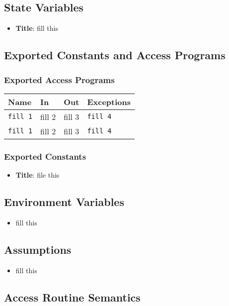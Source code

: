 \documentclass[12pt, titlepage]{article}
\begin{document}
\subsection{State Variables}
\begin{itemize}
    \item \textbf{Title}: fill this 
\end{itemize}

\subsection{Exported Constants and Access Programs}
\subsubsection{Exported Access Programs}
\begin{tabular}{|l|l|l|l|}
    \hline
    \textbf{Name} & \textbf{In} & \textbf{Out} & \textbf{Exceptions} \\
    \hline 
    \texttt{fill 1} & fill 2 & fill 3 & \texttt{fill 4} \\
    \hline
    \texttt{fill 1} & fill 2 & fill 3 & \texttt{fill 4} \\
    \hline
\end{tabular}

\subsubsection{Exported Constants}
\begin{itemize}
\item \textbf{Title}: file this 
\end{itemize}

\subsection{Environment Variables}
\begin{itemize}
    \item fill this
\end{itemize}

\subsection{Assumptions}
\begin{itemize}
    \item fill this
\end{itemize}

\subsection{Access Routine Semantics}
\end{document}
